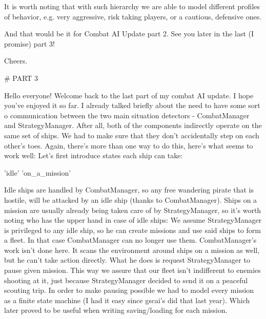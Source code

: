 It is worth noting that with such hierarchy we are able to model different profiles of behavior, e.g. very aggressive, risk taking players, or a cautious, defensive ones.

And that would be it for Combat AI Update part 2.
See you later in the last (I promise) part 3!

Cheers.

# PART 3

Hello everyone!
Welcome back to the last part of my combat AI update. I hope you've enjoyed it so far.
I already talked briefly about the need to have some sort o communication between the two main situation detectors - CombatManager and StrategyManager.
After all, both of the components indirectly operate on the same set of ships.
We had to make sure that they don't accidentally step on each other's toes.
Again, there's more than one way to do this, here's what seems to work well:
Let's first introduce states each ship can take:

    'idle'
    'on_a_mission'

Idle ships are handled by CombatManager, so any free wandering pirate that is hostile, will be attacked by an idle ship (thanks to CombatManager).
Ships on a mission are usually already being taken care of by StrategyManager, so it's worth noting who has the upper hand in case of idle ships:
We assume StrategyManager is privileged to any idle ship, so he can create missions and use said ships to form a fleet.
In that case CombatManager can no longer use them.
CombatManager's work isn't done here. It scans the environment around ships on a mission as well, but he can't take action directly.
What he does is request StrategyManager to pause given mission.
This way we assure that our fleet isn't indifferent to enemies shooting at it, just because StrategyManager decided to send it on a peaceful scouting trip.
In order to make pausing possible we had to model every mission as a finite state machine (I had it easy since gscai's did that last year).
Which later proved to be useful when writing saving/loading for each mission.

